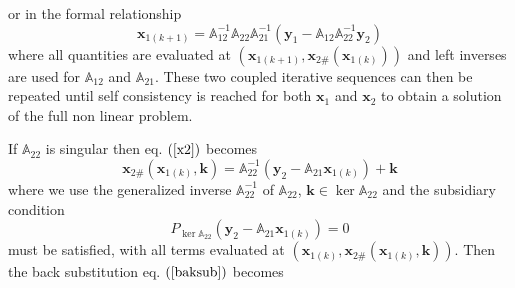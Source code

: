 \documentclass[aps,preprint]{revtex4}%
\begin{document}
or in the formal relationship
\begin{equation}
\mathbf{x}_{1\left(  k+1\right)  }=\mathbb{A}_{12}^{-1}\mathbb{A}%
_{22}\mathbb{A}_{21}^{-1}\left(  \mathbf{y}_{1}-\mathbb{A}_{12}\mathbb{A}%
_{22}^{-1}\mathbf{y}_{2}\right)  \label{x1kplus1}%
\end{equation}
where all quantities are evaluated at $\left(  \mathbf{x}_{1\left(
k+1\right)  },\mathbf{x}_{2\#}\left(  \mathbf{x}_{1\left(  k\right)  }\right)
\right)  $ and left inverses are used for $\mathbb{A}_{12}$ and $\mathbb{A}%
_{21}$. These two coupled iterative sequences can then be repeated until self
consistency is reached for both $\mathbf{x}_{1}$ and $\mathbf{x}_{2}$ to
obtain a solution of the full non linear problem.

If $\mathbb{A}_{22}$ is singular then eq. $\left(  \ref{x2}\right)  $ becomes%
\begin{equation}
\mathbf{x}_{2\#}\left(  \mathbf{x}_{1\left(  k\right)  },\mathbf{k}\right)
=\mathbb{A}_{22}^{-1}\left(  \mathbf{y}_{2}-\mathbb{A}_{21}\mathbf{x}%
_{1\left(  k\right)  }\right)  +\mathbf{k} \label{x2eq}%
\end{equation}
where we use the generalized inverse $\mathbb{A}_{22}^{-1}$ of $\mathbb{A}%
_{22}$, $\mathbf{k}\in\ker\mathbb{A}_{22}$ and the subsidiary condition
\begin{equation}
P_{\ker\mathbb{A}_{22}}\left(  \mathbf{y}_{2}-\mathbb{A}_{21}\mathbf{x}%
_{1\left(  k\right)  }\right)  =0 \label{x2cond}%
\end{equation}
must be satisfied, with all terms evaluated at $\left(  \mathbf{x}_{1\left(
k\right)  },\mathbf{x}_{2\#}\left(  \mathbf{x}_{1\left(  k\right)
},\mathbf{k}\right)  \right)  $. Then the back substitution eq. $\left(
\ref{baksub}\right)  $ becomes
\end{document}
